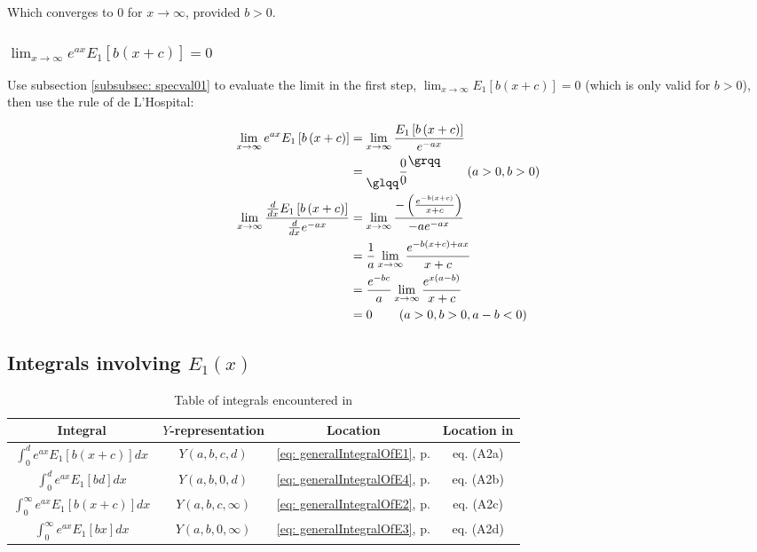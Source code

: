 \documentclass[bibliography=totocnumbered]{scrartcl}
\begin{document}
	Which converges to $0$ for $x\rightarrow\infty$, provided $b>0$.
	
	\subsubsection[A limit of E1, involving the exponential function]{$\lim_{x\rightarrow\infty}e^{ax}E_1\left[b\left(x+c\right)\right]=0$}
	\label{subsubsec: specval02}
	
	Use subsection \ref{subsubsec: specval01} to evaluate the limit in the first step, $\lim_{x\rightarrow\infty}E_1\left[b\left(x+c\right)\right]=0$ (which is only valid for $b>0$), then use the rule of de L'Hospital:
	
	\begin{align}
		\lim_{x\rightarrow\infty}e^{ax}E_1\left[b\left(x+c\right)\right]&=\lim_{x\rightarrow\infty}\frac{E_1\left[b\left(x+c\right)\right]}{e^{-ax}}\\
		&=\text{\raisebox{-9pt}{\glqq}}\frac{0}{0}\text{\raisebox{9pt}{\grqq}}\qquad\left(a>0, b>0\right)\\
		\lim_{x\rightarrow\infty}\frac{\frac{d}{dx}E_1\left[b\left(x+c\right)\right]}{\frac{d}{dx}e^{-ax}}&=\lim_{x\rightarrow\infty}\frac{-\left(\frac{e^{-b\left(x+c\right)}}{x+c}\right)}{-ae^{-ax}}\\
		&=\frac{1}{a}\lim_{x\rightarrow\infty}\frac{e^{-b\left(x+c\right)+ax}}{x+c}\\
		&=\frac{e^{-bc}}{a}\lim_{x\rightarrow\infty}\frac{e^{x\left(a-b\right)}}{x+c}\\
		&=0\qquad\left(a>0, b>0, a-b<0\right)
	\end{align}
	

	\subsection[Integrals involving E1(x)]{Integrals involving $E_1\left(x\right)$}
	
	\begin{table}[h]
		\centering
		\begin{tabular}{cccc}
			\toprule
			Integral & $Y$-representation & Location & Location in \cite{boer1990calc}\\
			\midrule
			$\int_{0}^{d}e^{ax}E_1\left[b\left(x+c\right)\right]dx$ & $Y\left(a,b,c,d\right)$ & \eqref{eq: generalIntegralOfE1}, p. \pageref{eq: generalIntegralOfE1} & eq. (A2a)\\
			$\int_{0}^{d}e^{ax}E_1\left[bd\right]dx$ & $Y\left(a,b,0,d\right)$ & \eqref{eq: generalIntegralOfE4}, p. \pageref{eq: generalIntegralOfE4} & eq. (A2b)\\
			$\int_{0}^{\infty}e^{ax}E_1\left[b\left(x+c\right)\right]dx$ & $Y\left(a,b,c,\infty\right)$ & \eqref{eq: generalIntegralOfE2}, p. \pageref{eq: generalIntegralOfE2} & eq. (A2c)\\
			$\int_{0}^{\infty}e^{ax}E_1\left[bx\right]dx$ & $Y\left(a,b,0,\infty\right)$ & \eqref{eq: generalIntegralOfE3}, p. \pageref{eq: generalIntegralOfE3} & eq. (A2d)\\
			\bottomrule
		\end{tabular}
		\caption{Table of integrals encountered in \cite{boer1990calc}}
		\label{tab: tableOfIntegrals}
	\end{table}
	
\end{document}
